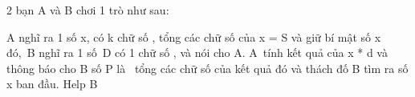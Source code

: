 2 bạn A và B chơi 1 trò như sau:  

   A nghĩ ra 1 số x, có k chữ số , tổng các chữ số của x = S và giữ bí mật số x đó, B nghĩ ra 1 số D có 1 chữ số , và nói cho A. A tính kết quả của x * d và thông báo cho B số P là  tổng các chữ số của kết quả đó và thách đố B tìm ra số x ban đầu. Help B